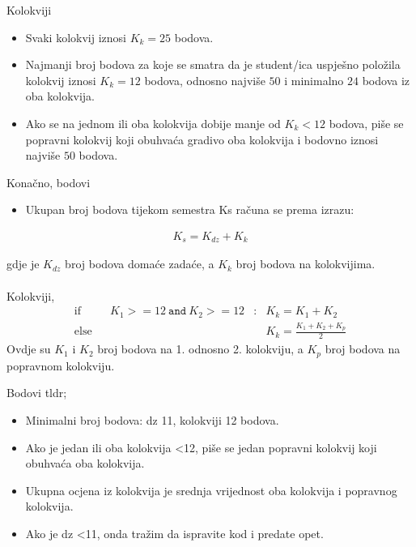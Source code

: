 \documentclass[9pt]{beamer}
\begin{document}
\begin{frame}{Kolokviji}
	\begin{itemize}
		\item Svaki kolokvij iznosi $K_k = 25$ bodova. 
		\item Najmanji broj bodova za koje se smatra da je student/ica uspješno položila kolokvij iznosi $K_k = 12$ bodova, odnosno najviše $50$ i minimalno $24$ bodova iz oba kolokvija.
		\item Ako se na jednom ili oba kolokvija dobije manje od $K_k < 12$ bodova, piše se popravni kolokvij koji obuhvaća gradivo oba kolokvija i bodovno iznosi najviše $50$ bodova.
	\end{itemize}
\end{frame}

\begin{frame}{Konačno, bodovi}
	\begin{itemize}
		\item Ukupan broj bodova tijekom semestra Ks računa se prema izrazu:
	\end{itemize}
	\begin{align*}
	K_s = K_{dz}+ K_k
	\end{align*}

gdje je $K_{dz}$ broj bodova domaće zadaće, a $K_k$ broj bodova na kolokvijima. 
\\\hrulefill\\
Kolokviji, 
	\begin{align*}
		\textrm{if}&&  K_1>=12\  \mathtt{and}  \ K_2>=12 &:&          K_k = K_1 + K_2 \\
		\textrm{else}&&   &&          K_k = \frac{K_1+K_2 + K_p}{2}
	\end{align*}
Ovdje su $K_1$ i $K_2$ broj bodova na 1. odnosno 2. kolokviju, a $K_p$ broj bodova na popravnom kolokviju.

\end{frame}


\begin{frame}{Bodovi tldr;}
	\begin{block}{}
		\begin{itemize}
			\item Minimalni broj bodova: dz 11, kolokviji 12 bodova. 
			\item Ako  je jedan ili oba kolokvija <12, piše se jedan popravni kolokvij koji obuhvaća oba kolokvija. 
			\item Ukupna ocjena iz kolokvija je srednja vrijednost oba kolokvija i popravnog kolokvija. 
			\item Ako je dz <11, onda tražim da ispravite kod i predate opet.  
		\end{itemize}
	\end{block}
\end{frame}
\end{document}
